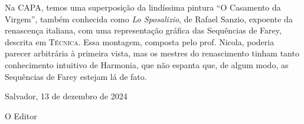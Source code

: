 \documentclass[onecolumn]{hipatia}
\begin{document}
\pagebreak

Na CAPA, temos uma superposição da lindíssima pintura ``O Casamento da Virgem'', também conhecida como \emph{Lo Sposalizio}, de Rafael Sanzio, expoente da renascença italiana, com uma representação
gráfica das Sequências de Farey, descrita em \textsc{Técnica}. 
Essa montagem, composta pelo prof. Nicola, poderia parecer arbitrária
 à primeira vista, mas os mestres do renascimento tinham
 tanto conhecimento intuitivo de Harmonia, que não espanta que,
 de algum modo, as Sequências de Farey estejam lá de fato.   

\vspace{1cm}

\hfill Salvador, 13 de dezembro de 2024

\hfill O Editor
\end{document}
